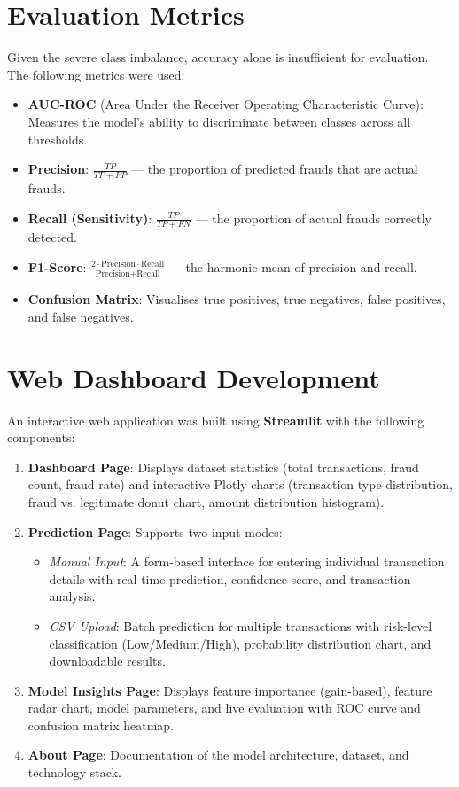 \documentclass[12pt,a4paper]{report}
\begin{document}
\section{Evaluation Metrics}

Given the severe class imbalance, accuracy alone is insufficient for evaluation. The following metrics were used:

\begin{itemize}
    \item \textbf{AUC-ROC} (Area Under the Receiver Operating Characteristic Curve): Measures the model's ability to discriminate between classes across all thresholds.
    \item \textbf{Precision}: $\frac{TP}{TP + FP}$ — the proportion of predicted frauds that are actual frauds.
    \item \textbf{Recall (Sensitivity)}: $\frac{TP}{TP + FN}$ — the proportion of actual frauds correctly detected.
    \item \textbf{F1-Score}: $\frac{2 \cdot \text{Precision} \cdot \text{Recall}}{\text{Precision} + \text{Recall}}$ — the harmonic mean of precision and recall.
    \item \textbf{Confusion Matrix}: Visualises true positives, true negatives, false positives, and false negatives.
\end{itemize}

\section{Web Dashboard Development}

An interactive web application was built using \textbf{Streamlit} with the following components:

\begin{enumerate}
    \item \textbf{Dashboard Page}: Displays dataset statistics (total transactions, fraud count, fraud rate) and interactive Plotly charts (transaction type distribution, fraud vs. legitimate donut chart, amount distribution histogram).
    \item \textbf{Prediction Page}: Supports two input modes:
    \begin{itemize}
        \item \textit{Manual Input}: A form-based interface for entering individual transaction details with real-time prediction, confidence score, and transaction analysis.
        \item \textit{CSV Upload}: Batch prediction for multiple transactions with risk-level classification (Low/Medium/High), probability distribution chart, and downloadable results.
    \end{itemize}
    \item \textbf{Model Insights Page}: Displays feature importance (gain-based), feature radar chart, model parameters, and live evaluation with ROC curve and confusion matrix heatmap.
    \item \textbf{About Page}: Documentation of the model architecture, dataset, and technology stack.
\end{enumerate}
\end{document}
